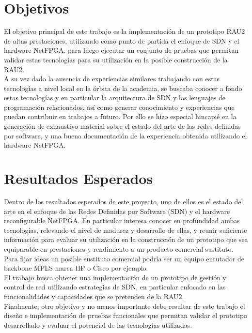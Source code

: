 \section{Objetivos}
El objetivo principal de este trabajo es la implementación de un prototipo RAU2 de altas prestaciones, utilizando como punto de partida el enfoque de SDN y el hardware NetFPGA, para luego ejecutar un conjunto de pruebas que permitan validar estas tecnologías para su utilización en  la posible construcción de la RAU2.\\

A su vez dado la ausencia de experiencias similares  trabajando con estas tecnologías a nivel local en la órbita de la academia, se buscaba conocer a fondo estas tecnologías y en particular la arquitectura de SDN y los lenguajes de programación relacionados, así como generar conocimiento y experiencias que puedan contribuir en trabajos a futuro. Por ello se hizo especial hincapié en la generación de exhaustivo material sobre el estado del arte de las redes definidas por software, y una buena documentación de la experiencia obtenida utilizando el hardware NetFPGA.

\section{Resultados Esperados}
Dentro de los resultados esperados de este proyecto, uno de ellos es el estado del arte en el enfoque de las Redes Definidas por Software (SDN) y el hardware reconfigurable NetFPGA. En particular interesa conocer en profundidad ambas tecnologías, relevando el nivel de madurez y desarrollo de ellas, y reunir suficiente información para evaluar su utilización en la construcción de un prototipo que sea equiparable en prestaciones y rendimiento a un producto comercial sustituto. Para fijar ideas un posible sustituto comercial podría ser un equipo enrutador de backbone MPLS marca HP o Cisco por ejemplo.\\
                   
El trabajo busca obtener una implementación de un prototipo de gestión y control de red utilizando estrategias de SDN, en particular enfocado en las funcionalidades y capacidades que se pretenden de la RAU2.\\

Finalmente, otro objetivo y no menos importante debe resultar de este trabajo el diseño e implementación de pruebas funcionales que permitan validar el prototipo desarrollado y evaluar el potencial de las tecnologías utilizadas.

